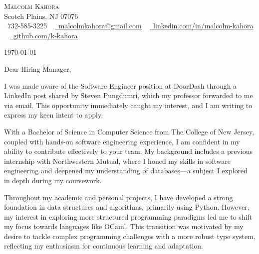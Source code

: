 \documentclass[letterpaper,11pt]{article}
\begin{document}
\begin{center}
    {\Huge \scshape Malcolm Kahora} \\ \vspace{1pt}
    Scotch Plains, NJ 07076 \\ \vspace{1pt}
    \small \raisebox{-0.1\height}\faPhone\ 732-585-3225 ~ \href{mailto:malcolmkahora@gmail.com}{\raisebox{-0.2\height}\faEnvelope\  \underline{malcolmkahora@gmail.com}} ~ 
    \href{https://linkedin.com/in/malcolm-kahora/}{\raisebox{-0.2\height}\faLinkedin\ \underline{linkedin.com/in/malcolm-kahora}}  ~
    \href{https://github.com/k-kahora}{\raisebox{-0.2\height}\faGithub\ \underline{github.com/k-kahora}}
    \vspace{-8pt}
\end{center}

\vspace{12pt}
\today


\vspace{12pt}
Dear Hiring Manager,

\vspace{12pt}
I was made aware of the Software Engineer position at DoorDash through a LinkedIn post shared by Steven Pungdumri, which my professor forwarded to me via email. This opportunity immediately caught my interest, and I am writing to express my keen intent to apply.

With a Bachelor of Science in Computer Science from The College of New Jersey, coupled with hands-on software engineering experience, I am confident in my ability to contribute effectively to your team. My background includes a previous internship with Northwestern Mutual, where I honed my skills in software engineering and deepened my understanding of databases—a subject I explored in depth during my coursework.

Throughout my academic and personal projects, I have developed a strong foundation in data structures and algorithms, primarily using Python. However, my interest in exploring more structured programming paradigms led me to shift my focus towards languages like OCaml. This transition was motivated by my desire to tackle complex programming challenges with a more robust type system, reflecting my enthusiasm for continuous learning and adaptation.
\end{document}
